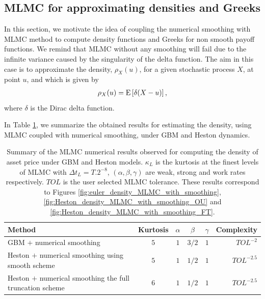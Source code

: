 \subsection{MLMC for approximating densities and Greeks}\label{sec: MLMC for approximating densities and greeks}
In this section, we motivate the idea of coupling the numerical smoothing  with MLMC method to compute density functions and Greeks for non smooth payoff functions. We remind that MLMC without any smoothing  will fail due to the infinite variance caused by the singularity of  the delta function. The aim in this case is to approximate the density, $\rho_{X}(u)$, for a given stochastic process $X$, at point $u$, and which is given by 
\begin{align}
\rho_{X}(u)=\mathrm{E}\left[\delta(X-u)\right],
\end{align}
where $\delta$ is the Dirac delta function.


In Table \ref{table:Summary of our numerical results density.}, we summarize the obtained results for estimating the density, using MLMC coupled with numerical smoothing, under GBM and Heston dynamics. 
\FloatBarrier

\begin{table}[!h]
	\centering
	\begin{small}
	\begin{tabular}{l*{4}{c}r}
	\toprule[1.5pt]
		Method      &   Kurtosis & $\alpha$   &  $\beta$  &  $\gamma$   & Complexity \\
		\hline
			GBM $+$ numerical smoothing & $5$ & $1$  &  $3/2$&  $1$&  $TOL^{-2}$\\	
              \hline 
           Heston $+$ numerical smoothing  using smooth scheme & $5$ & $1$  &  $1/2$ & $1$ &  $TOL^{-2.5}$\\	
               \hline
            Heston $+$ numerical smoothing  the full truncation scheme & $6$ & $1$  &  $1/2$&  $1$ &  $TOL^{-2.5}$\\	
		\bottomrule[1.25pt]
	\end{tabular}
\end{small}
	\caption{Summary of the MLMC numerical results observed for  computing the density of asset price under GBM and   Heston models. $\kappa_{L}$ is the kurtosis at the finest levels of MLMC with $\Delta t_{L}=T.2^{-8}$, $(\alpha,\beta,\gamma)$ are weak, strong and work rates respectively. $TOL$ is the user selected  MLMC  tolerance. These results correspond to Figures \ref{fig:euler_density_MLMC_with_smoothing}, \ref{fig:Heston_density_MLMC_with_smoothing_OU} and \ref{fig:Heston_density_MLMC_with_smoothing_FT}.}
	\label{table:Summary of our numerical results density.}
\end{table}
\FloatBarrier

